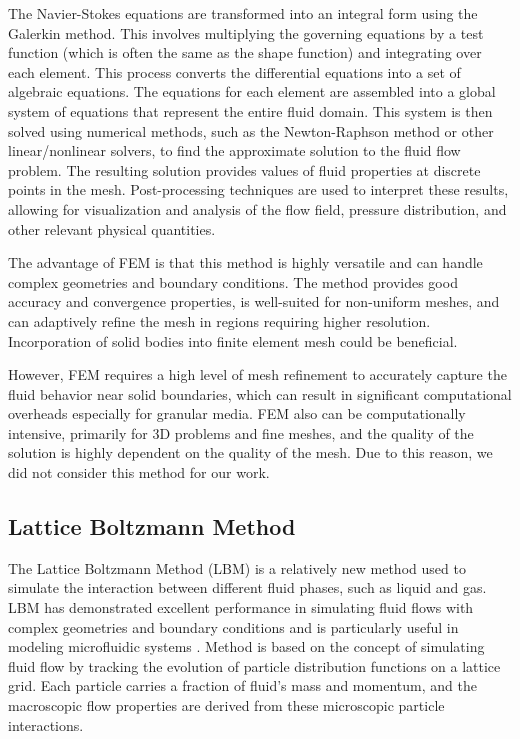 The Navier-Stokes equations are transformed into an integral form using the Galerkin method. This involves multiplying the governing equations by a test function (which is often the same as the shape function) and integrating over each element. This process converts the differential equations into a set of algebraic equations. The equations for each element are assembled into a global system of equations that represent the entire fluid domain. This system is then solved using numerical methods, such as the Newton-Raphson method or other linear/nonlinear solvers, to find the approximate solution to the fluid flow problem. The resulting solution provides values of fluid properties at discrete points in the mesh. Post-processing techniques are used to interpret these results, allowing for visualization and analysis of the flow field, pressure distribution, and other relevant physical quantities.

The advantage of FEM is that this method is highly versatile and can handle complex geometries and boundary conditions. The method provides good accuracy and convergence properties, is well-suited for non-uniform meshes, and can adaptively refine the mesh in regions requiring higher resolution. Incorporation of solid bodies into finite element mesh could be beneficial.

However, FEM requires a high level of mesh refinement to accurately capture the fluid behavior near solid boundaries, which can result in significant computational overheads \cite{FEM_2} especially  for granular media. FEM also can be computationally intensive, primarily for 3D problems and fine meshes, and the quality of the solution is highly dependent on the quality of the mesh. Due to this reason, we did not consider this method for our work.

\subsection{Lattice Boltzmann Method}
 
The Lattice Boltzmann Method (LBM)\cite{begum2008lattice} is a relatively new method used to simulate the interaction between different fluid phases, such as liquid and gas. LBM has demonstrated excellent performance in simulating fluid flows with complex geometries and boundary conditions and is particularly useful in modeling microfluidic systems \cite{aidun2010lattice}. Method is based on the concept of simulating fluid flow by tracking the evolution of particle distribution functions on a lattice grid. Each particle carries a fraction of fluid's mass and momentum, and the macroscopic flow properties are derived from these microscopic particle interactions.

